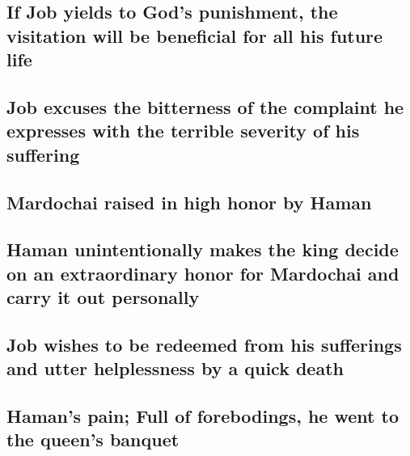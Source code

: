 \hypertarget{if-job-yields-to-gods-punishment-the-visitation-will-be-beneficial-for-all-his-future-life}{%
\subsection{If Job yields to God's punishment, the visitation will be
beneficial for all his future
life}\label{if-job-yields-to-gods-punishment-the-visitation-will-be-beneficial-for-all-his-future-life}}

\hypertarget{job-excuses-the-bitterness-of-the-complaint-he-expresses-with-the-terrible-severity-of-his-suffering}{%
\subsection{Job excuses the bitterness of the complaint he expresses
with the terrible severity of his
suffering}\label{job-excuses-the-bitterness-of-the-complaint-he-expresses-with-the-terrible-severity-of-his-suffering}}

\hypertarget{mardochai-raised-in-high-honor-by-haman}{%
\subsection{Mardochai raised in high honor by
Haman}\label{mardochai-raised-in-high-honor-by-haman}}

\hypertarget{haman-unintentionally-makes-the-king-decide-on-an-extraordinary-honor-for-mardochai-and-carry-it-out-personally}{%
\subsection{Haman unintentionally makes the king decide on an
extraordinary honor for Mardochai and carry it out
personally}\label{haman-unintentionally-makes-the-king-decide-on-an-extraordinary-honor-for-mardochai-and-carry-it-out-personally}}

\hypertarget{job-wishes-to-be-redeemed-from-his-sufferings-and-utter-helplessness-by-a-quick-death}{%
\subsection{Job wishes to be redeemed from his sufferings and utter
helplessness by a quick
death}\label{job-wishes-to-be-redeemed-from-his-sufferings-and-utter-helplessness-by-a-quick-death}}

\hypertarget{hamans-pain-full-of-forebodings-he-went-to-the-queens-banquet}{%
\subsection{Haman's pain; Full of forebodings, he went to the queen's
banquet}\label{hamans-pain-full-of-forebodings-he-went-to-the-queens-banquet}}

